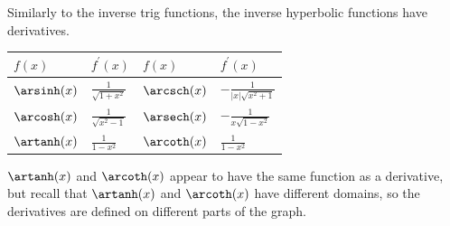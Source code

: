 \documentclass{ximera}
\begin{document}
Similarly to the inverse trig functions, the inverse hyperbolic functions have derivatives.

\begin{center}
\begin{tabular}[t]{|l|l|l|l|}
\hline
$f(x)$ & $f^{\prime}(x)$ & $f(x)$ & $f^{\prime}(x)$ \\
\hline
$\arsinh(x)$ & $\frac{1}{\sqrt{1+x^{2}}}$ & $\arcsch(x)$ & $-\frac{1}{|x| \sqrt{x^{2}+1}}$ \\
\hline
$\arcosh(x)$ & $\frac{1}{\sqrt{x^{2}-1}}$ & $\arsech(x)$ & $-\frac{1}{x \sqrt{1-x^{2}}}$ \\
\hline
$\artanh(x)$ & $\frac{1}{1-x^{2}}$ & $\arcoth(x)$ & $\frac{1}{1-x^{2}}$ \\
\hline
\end{tabular}
\end{center}

\begin{warning}
$\artanh(x)$ and $\arcoth(x)$ appear to have the same function as a derivative, but recall that $\artanh(x)$ and $\arcoth(x)$ have different domains, so the derivatives are defined on different parts of the graph.
\end{warning}
\end{document}
